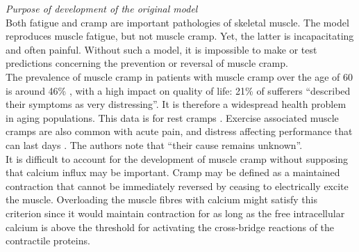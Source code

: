 \documentclass[fleqn,10pt]{physiome}
\begin{document}
\textit{Purpose of development of the original model}\\\newline
Both fatigue and cramp are important pathologies of skeletal muscle. The \cite{shorten2007mathematical} model reproduces muscle fatigue, but not muscle cramp. Yet, the latter is incapacitating and often painful. Without such a model, it is impossible to make or test predictions concerning the prevention or reversal of muscle cramp.\\\newline
The prevalence of muscle cramp in patients with muscle cramp over the age of 60 is around 46\% \citep{maisonneuve2016prevalence}, with a high impact on quality of life: 21\% of sufferers “described their symptoms as very distressing”. It is therefore a widespread health problem in aging populations. This data is for rest cramps  \citep{naylor1994general}. Exercise associated muscle cramps are also common with acute pain, and distress affecting performance that can last days \citep{millerexercise}. The authors note that “their cause remains unknown”.\\\newline
It is difficult to account for the development of muscle cramp without supposing that calcium influx may be important. Cramp may be defined as a maintained contraction that cannot be immediately reversed by ceasing to electrically excite the muscle. Overloading the muscle fibres with calcium might satisfy this criterion since it would maintain contraction for as long as the free intracellular calcium is above the threshold for activating the cross-bridge reactions of the contractile proteins.
\end{document}
